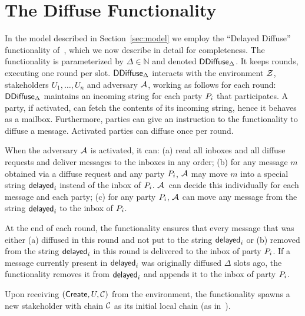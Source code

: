 \section{The Diffuse Functionality}
\label{diffuse}


In the model described in Section~\ref{sec:model} we employ the
``Delayed Diffuse'' functionality of~\cite{EC:DGKR18}, which we now describe
in detail for completeness.
The functionality is para\-meterized by $\Delta\in\mathbb{N}$ and
denoted {$\mathsf{DDiffuse}_\Delta$}. It keeps rounds, executing one round per slot.
{$\mathsf{DDiffuse}_\Delta$} interacts with the environment $\mathcal{Z}$, stakeholders
$U_1,\ldots,U_n$ and adversary $\mathcal{A}$,
working as follows for each
round:
  {$\mathsf{DDiffuse}_\Delta$} maintains an incoming string for each party $P_i$ that participates. A party,
if activated, can fetch the contents of its incoming
string, hence it behaves as a mailbox. Furthermore, parties can give
an instruction to the functionality to diffuse a message. Activated parties can diffuse once per round.

  When the adversary $\mathcal{A}$ is activated,
  it can:
    (a) read all
    inboxes and all diffuse requests and deliver messages to the inboxes in any
    order;
    (b) for any message $m$ obtained via a diffuse request and any party $P_i$,
      $\mathcal{A}$ may move $m$ into a special string $\mathsf{delayed}_i$ instead of the
      inbox of $P_i$. $\mathcal{A}$~can decide this individually for each message and
      each party;
    (c) for any party $P_i$, $\mathcal{A}$ can move any message from the string
      $\mathsf{delayed}_i$ to the inbox of $P_i$.

  At the end of each round, the functionality ensures that every message
  that was either (a) diffused in this round and not put to the string
  $\mathsf{delayed}_i$  or (b) removed from the string $\mathsf{delayed}_i$ in this round
  is delivered to the inbox of  party $P_i$.
  If a message currently present in $\mathsf{delayed}_i$ was
  originally diffused $\Delta$ slots ago, the functionality
  removes it from $\mathsf{delayed}_i$ and appends it to the inbox of party $P_i$.

    Upon receiving $(\mathsf{Create},U,\mathcal{C})$ from the environment, the
    functionality spawns a new stakeholder with chain $\mathcal{C}$ as its initial
    local chain (as in~\cite{C:KRDO17,EC:DGKR18}).

